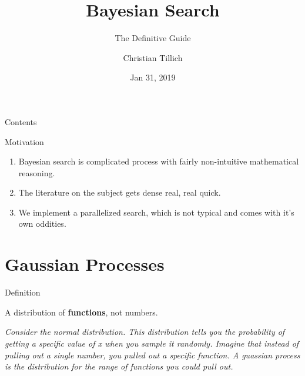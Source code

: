 \documentclass[10pt,ignorenonframetext,]{beamer}
\title{Bayesian Search}
\subtitle{The Definitive Guide}
\author{Christian Tillich}
\date{Jan 31, 2019}
\providecommand{\tightlist}{%
  \setlength{\itemsep}{0pt}\setlength{\parskip}{0pt}}
\begin{document}
\frame{\titlepage}

\begin{frame}{Contents}
\protect\hypertarget{contents}{}

\tableofcontents

\end{frame}

\begin{frame}{Motivation}
\protect\hypertarget{motivation}{}

\begin{enumerate}
\tightlist
\item
  Bayesian search is complicated process with fairly non-intuitive
  mathematical reasoning.
\item
  The literature on the subject gets dense real, real quick.
\item
  We implement a parallelized search, which is not typical and comes
  with it's own oddities.
\end{enumerate}

\end{frame}

\hypertarget{gaussian-processes}{%
\section{Gaussian Processes}\label{gaussian-processes}}

\begin{frame}{Definition}
\protect\hypertarget{definition}{}

A distribution of \textbf{functions}, not numbers.

\emph{Consider the normal distribution. This distribution tells you the
probability of getting a specific value of x when you sample it
randomly. Imagine that instead of pulling out a single number, you
pulled out a specific function. A guassian process is the distribution
for the range of functions you could pull out.}

\end{frame}
\end{document}

